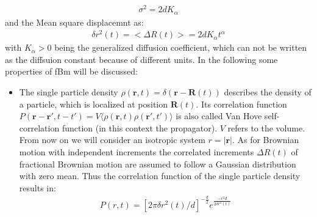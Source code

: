 \documentclass[
  a4paper,BCOR10mm,oneside,
  bibtotoc,idxtotoc,
  headsepline,footsepline,%
  fleqn,openbib
]{scrbook}
\begin{document}
\begin{align}
\sigma^2=2dK_{\alpha}
\end{align}
and the Mean square displacemnt as:
\begin{align}
\delta r^{2}(t)= < \Delta R(t)>=2dK_{\alpha} t^{\alpha}
\end{align}
with $K_{\alpha}>0$  being the generalized diffusion coefficient, which can not be written as the diffsuion constant because of different units.
\newline
In the following some properties of fBm will be discussed:
\begin{itemize}
 \item The single particle density $\rho(\bm{r},t)=\delta(\bm{r}-\bm{R}(t))$ describes the density of a particle, which is localized at position $\bm{R}(t)$. Its correlation function $P(\bm{r}-\bm{r}',t-t')= V\langle\rho(\bm{r},t) \rho(\bm{r}',t')\rangle$ is also called Van Hove self-correlation function (in this context the propagator). $V$ refers to the volume. From now on we will consider an isotropic system $ r= |\bm{r}|$. As for Brownian motion with independent increments the correlated increments  $\Delta R(t)$ of fractional Brownian motion are assumed to follow a Gaussian distribution with zero mean. Thus the correlation function of the single particle density results in:
\begin{align}
 P(r,t)=[2 \pi \delta r^{2}(t)/d]^{-\frac{d}{2}} e^{ \frac{-r^2 d}{2 \delta r^{2}(t) }}
\end{align}


\end{itemize}
\end{document}
